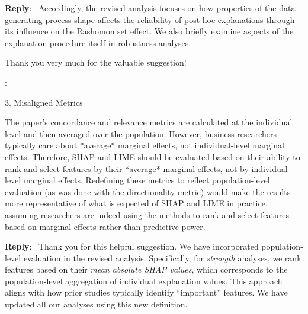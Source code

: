 \documentclass[11pt]{article}
\newcounter{se}[section]
\newcounter{reviewer}
\newcounter{point}[reviewer]
\renewcommand{\thepoint}{R\,\thereviewer.\arabic{point}}
\newenvironment{point}{
    \refstepcounter{point} \bigskip \noindent {\textbf{\thepoint}}: \rmfamily \itshape
}{\medskip}
\newenvironment{reply}
 {\par\medskip \noindent \begin{sf}\textbf{Reply}:\ }
 {\medskip \end{sf}}
\begin{document}
\begin{reply}
Accordingly, the revised analysis focuses on how properties of the data-generating process shape affects the reliability of post-hoc explanations through its influence on the Rashomon set effect. We also briefly examine aspects of the explanation procedure itself in robustness analyses.

Thank you very much for the valuable suggestion!
\end{reply}



\begin{point}
3.      Misaligned Metrics 

The paper’s concordance and relevance metrics are calculated at the individual level and then averaged over the population. However, business researchers typically care about *average* marginal effects, not individual-level marginal effects. Therefore, SHAP and LIME should be evaluated based on their ability to rank and select features by their *average* marginal effects, not by individual-level marginal effects. Redefining these metrics to reflect population-level evaluation (as was done with the directionality metric) would make the results more representative of what is expected of SHAP and LIME in practice, assuming researchers are indeed using the methods to rank and select features based on marginal effects rather than predictive power.
\end{point}

\begin{reply}
Thank you for this helpful suggestion. We have incorporated population-level evaluation in the revised analysis. Specifically, for \emph{strength} analyses, we rank features based on their \textit{mean absolute SHAP values}, which corresponds to the population-level aggregation of individual explanation values. This approach aligns with how prior studies typically identify “important” features. We have updated all our analyses using this new definition. %



\end{reply}
\end{document}

